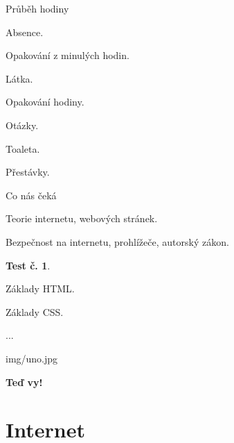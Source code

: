 \documentclass[aspectratio=1610]{beamer}
\begin{document}
\begin{frame}{Průběh hodiny}
    \begin{cardTiny}
        \begin{flushleft}
            Absence.

            Opakování z minulých hodin.

            Látka.

            Opakování hodiny.
        \end{flushleft}
    \end{cardTiny}
    \begin{cardTiny}
        \begin{flushleft}
            Otázky.

            Toaleta.

            Přestávky.
        \end{flushleft}
    \end{cardTiny}
\end{frame}

\begin{frame}{Co nás čeká}
    \begin{cardTiny}
        \begin{flushleft}
            Teorie internetu, webových stránek.

            Bezpečnost na internetu, prohlížeče, autorský zákon.
            
            \textbf{Test č. 1}.

            Základy HTML.

            Základy CSS.

            ...
        \end{flushleft}
    \end{cardTiny}
\end{frame}

\begin{frameImg}[width]{img/uno.jpg}
    \vspace*{60mm}
    \begin{cardTiny}
        \vspace*{\fill}
        \begin{center}
            \textbf{Teď vy!}
        \end{center}
    \end{cardTiny}
\end{frameImg}


\section{Internet}
\end{document}
